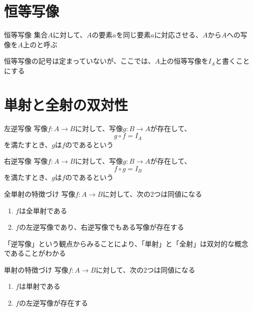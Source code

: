 \documentclass[b5paper,12pt]{jsarticle}
\begin{document}
\sectionline
\section{恒等写像}

\begin{definition}{恒等写像}
  集合$A$に対して、$A$の要素$a$を同じ要素$a$に対応させる、$A$から$A$への写像を$A$上のと呼ぶ
\end{definition}

恒等写像の記号は定まっていないが、ここでは、$A$上の恒等写像を$I_A$と書くことにする

\sectionline
\section{単射と全射の双対性}

\begin{definition}{左逆写像}
  写像$f\colon A \to B$に対して、写像$g\colon B \to A$が存在して、
  \begin{equation*}
    g \circ f = I_A
  \end{equation*}
  を満たすとき、$g$は$f$のであるという
\end{definition}

\begin{definition}{右逆写像}
  写像$f\colon A \to B$に対して、写像$g\colon B \to A$が存在して、
  \begin{equation*}
    f \circ g = I_B
  \end{equation*}
  を満たすとき、$g$は$f$のであるという
\end{definition}

\begin{theorem}{全単射の特徴づけ}
  写像$f\colon A \to B$に対して、次の2つは同値になる
  \begin{enumerate}
    \item $f$は全単射である
    \item $f$の左逆写像であり、右逆写像でもある写像が存在する
  \end{enumerate}
\end{theorem}

\sectionline

「逆写像」という観点からみることにより、「単射」と「全射」は双対的な概念であることがわかる

\begin{theorem}{単射の特徴づけ}
  写像$f\colon A \to B$に対して、次の2つは同値になる
  \begin{enumerate}
    \item $f$は単射である
    \item $f$の左逆写像が存在する
  \end{enumerate}
\end{theorem}
\end{document}
